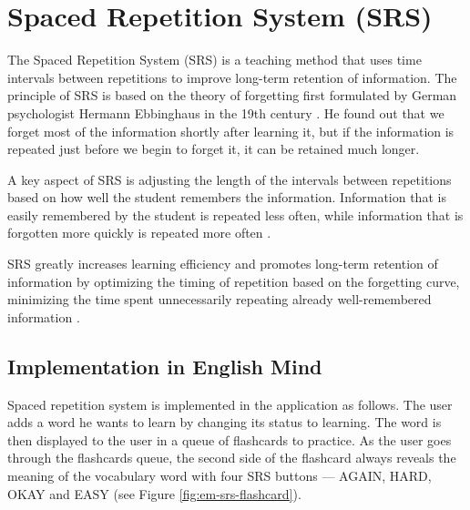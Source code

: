 \section{Spaced Repetition System (SRS)}

The Spaced Repetition System (SRS) is a teaching method that uses time intervals between repetitions to improve long-term retention of information. The principle of SRS is based on the theory of forgetting first formulated by German psychologist Hermann Ebbinghaus in the 19th century \cite{cite:ebbinghaus2013_memory_contribution_to_experimantal_psychology}. He found out that we forget most of the information shortly after learning it, but if the information is repeated just before we begin to forget it, it can be retained much longer.

A key aspect of SRS is adjusting the length of the intervals between repetitions based on how well the student remembers the information. Information that is easily remembered by the student is repeated less often, while information that is forgotten more quickly is repeated more often \cite{cite:kang2016_spaced_repetiton_promotes_efficient_learning}.

SRS greatly increases learning efficiency and promotes long-term retention of information by optimizing the timing of repetition based on the forgetting curve, minimizing the time spent unnecessarily repeating already well-remembered information \cite{cite:kang2016_spaced_repetiton_promotes_efficient_learning}.

\subsection*{Implementation in English Mind}

Spaced repetition system is implemented in the application as follows. The user adds a word he wants to learn by changing its status to learning. The word is then displayed to the user in a queue of flashcards to practice. As the user goes through the flashcards queue, the second side of the flashcard always reveals the meaning of the vocabulary word with four SRS buttons — AGAIN, HARD, OKAY and EASY (see Figure \ref{fig:em-srs-flashcard}).

